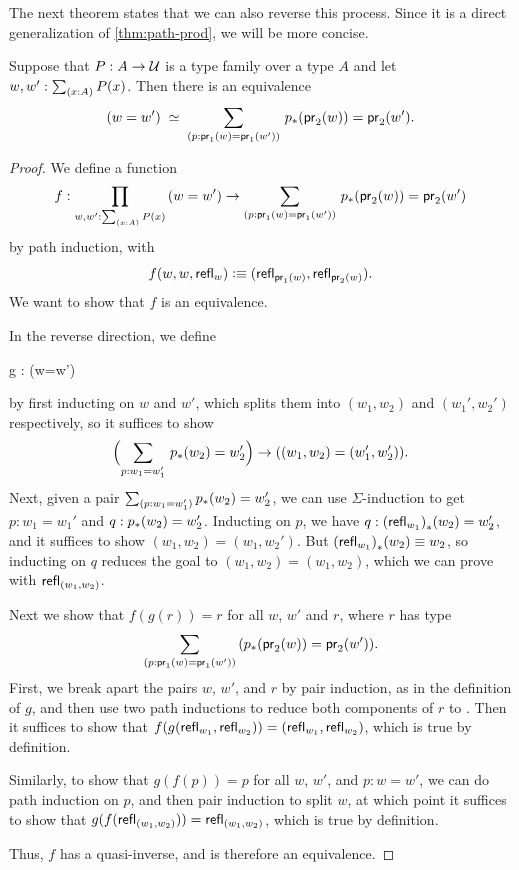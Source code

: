 The next theorem states that we can also reverse this process.
Since it is a direct generalization of \cref{thm:path-prod}, we will be more concise.

\begin{thm}\label{thm:path-sigma}
Suppose that $P:A\to\mathcal{U}$ is a type family over a type $A$ and let $w,w':\sm{x:A}P(x)$. Then there is an equivalence
\begin{equation*}
\eqvspaced{(w=w')}{\dsm{p:\proj{1}(w)=\proj{1}(w')} \trans{p}{\proj{2}(w)}=\proj{2}(w')}.
\end{equation*}
\end{thm}

\begin{proof}
We define a function
\begin{equation*}
f : \prd{w,w':\sm{x:A}P(x)} (w=w') \to \dsm{p:\proj{1}(w)=\proj{1}(w')} \trans{p}{\proj{2}(w)}=\proj{2}(w')
\end{equation*}
by path induction, with
\begin{equation*}
f(w,w,\mathsf{refl}_{w})\vcentcolon\equiv(\mathsf{refl}_{\mathsf{pr}_{1}(w)},\mathsf{refl}_{\mathsf{pr}_{2}(w)}).
\end{equation*}
We want to show that $f$ is an equivalence.

In the reverse direction, we define
\begin{narrowmultline*}
  g : 
      \to
      \narrowbreak
      (w=w')
\end{narrowmultline*}
by first inducting on $w$ and $w'$, which splits them into $(w_1,w_2)$ and
$(w_1',w_2')$ respectively, so it suffices to show
\begin{equation*}
\Parens{\sm{p:w_1 = w_1'}\trans{p}{w_2}=w_2'} \to ((w_1,w_2)=(w_1',w_2')).
\end{equation*}
Next, given a pair $\sm{p:w_1 = w_1'}\trans{p}{w_2}=w_2'$, we can
use $\Sigma$-induction to get $p : w_1 = w_1'$ and $q :
{p}_{*}\mathopen{}\left({w_2}\right)\mathclose{}=w_2'$.  Inducting on $p$, we have $q :
{(\mathsf{refl}_{w_1})}_{*}\mathopen{}\left({w_2}\right)\mathclose{}=w_2'$, and it suffices to show
$(w_1,w_2)=(w_1,w_2')$.  But ${(\mathsf{refl}_{w_1})}_{*}\mathopen{}\left({w_2}\right)\mathclose{} \equiv w_2$, so
inducting on $q$ reduces the goal to
$(w_1,w_2)=(w_1,w_2)$, which we can prove with $\mathsf{refl}_{(w_1,w_2)}$.

Next we show that $f(g(r))=r$ for all $w$, $w'$ and
$r$, where $r$ has type
\[\dsm{p:\proj{1}(w)=\proj{1}(w')} (\trans{p}{\proj{2}(w)}=\proj{2}(w')).\]
First, we break apart the pairs $w$, $w'$, and $r$ by pair induction, as in the
definition of $g$, and then use two path inductions to reduce both components
of $r$ to .  Then it suffices to show that
$f (g(\mathsf{refl}_{w_1},\mathsf{refl}_{w_2})) = (\mathsf{refl}_{w_1},\mathsf{refl}_{w_2})$, which is true by definition.

Similarly, to show that $g(f(p))=p$ for all $w$, $w'$,
and $p : w = w'$, we can do path induction on $p$, and then pair induction to
split $w$, at which point it suffices to show that
$g(f (\mathsf{refl}_{(w_1,w_2)})) = \mathsf{refl}_{(w_1,w_2)}$, which is true by
definition.

Thus, $f$ has a quasi-inverse, and is therefore an equivalence.
\end{proof}

